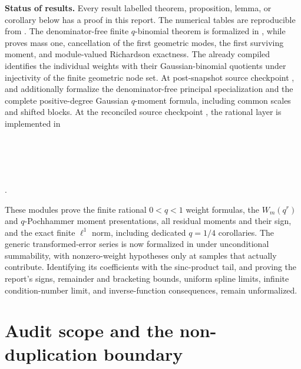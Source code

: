 \documentclass[11pt,oneside]{article}
\numberwithin{equation}{section}
\theoremstyle{definition}
\theoremstyle{remark}
\begin{document}
\medskip
\noindent\textbf{Status of results.}
Every result labelled theorem, proposition, lemma, or corollary below has a proof
in this report. The numerical tables are reproducible from
.  The denominator-free finite
\(q\)-binomial theorem is formalized in , while
 proves mass one, cancellation of the first
geometric modes, the first surviving moment, and module-valued Richardson
exactness.  The already compiled 
identifies the individual weights with their Gaussian-binomial quotients under
injectivity of the finite geometric node set.  At post-snapshot source
checkpoint ,
 and
 additionally formalize the
denominator-free principal specialization and the complete positive-degree
Gaussian \(q\)-moment formula, including common scales and shifted blocks.
At the reconciled source checkpoint
,
the rational layer is implemented in
\begin{center}
\\
\\
\\
\\
.
\end{center}
These modules prove the finite rational
\(0<q<1\) weight formulas, the \(W_m(q^r)\) and \(q\)-Pochhammer moment
presentations, all residual moments and their sign, and the exact finite
\(\ell^1\) norm, including dedicated \(q=1/4\) corollaries.  The
generic transformed-error series is now formalized in
 under unconditional summability, with
nonzero-weight hypotheses only at samples that actually contribute.  Identifying
its coefficients with the sinc-product tail, and proving the report's signs,
remainder and bracketing bounds, uniform spline limits, infinite condition-number
limit, and inverse-function consequences, remain unformalized.



\section{Audit scope and the non-duplication boundary}
\end{document}
